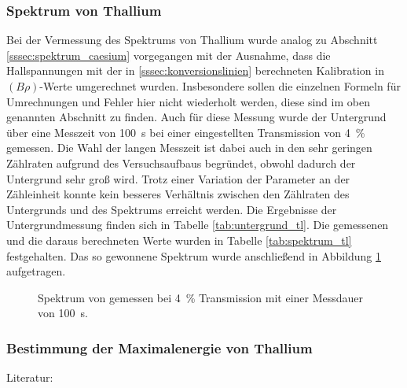 \documentclass[11pt, a4paper]{article}
\numberwithin{equation}{section}
\begin{document}
\subsubsection{Spektrum von Thallium}
\begin{table}
	\centering
	
	\caption{Untergrundmessung von  mit einer Messdauer von \SI{100}{\second} bei \SI{4}{\percent} Transmission.}
	\label{tab:untergrund_tl}
\end{table}
Bei der Vermessung des Spektrums von Thallium wurde analog zu Abschnitt \ref{sssec:spektrum_caesium} vorgegangen mit der Ausnahme, dass die Hallspannungen mit der in \ref{sssec:konversionslinien} berechneten Kalibration in $(B \rho)$-Werte umgerechnet wurden.
Insbesondere sollen die einzelnen Formeln für Umrechnungen und Fehler hier nicht wiederholt werden, diese sind im oben genannten Abschnitt zu finden.
Auch für diese Messung wurde der Untergrund über eine Messzeit von \SI{100}{\second} bei einer eingestellten Transmission von \SI{4}{\percent} gemessen.
Die Wahl der langen Messzeit ist dabei auch in den sehr geringen Zählraten aufgrund des Versuchsaufbaus begründet, obwohl dadurch der Untergrund sehr groß wird.
Trotz einer Variation der Parameter an der Zähleinheit konnte kein besseres Verhältnis zwischen den Zählraten des Untergrunds und des Spektrums erreicht werden.
Die Ergebnisse der Untergrundmessung finden sich in Tabelle \ref{tab:untergrund_tl}.
Die gemessenen und die daraus berechneten Werte wurden in Tabelle \ref{tab:spektrum_tl} festgehalten.
Das so gewonnene Spektrum wurde anschließend in Abbildung \ref{fig:thallium_spectrum} aufgetragen.
\begin{figure}[h]
	\centering
	
	\caption{Spektrum von  gemessen bei \SI{4}{\percent} Transmission mit einer Messdauer von \SI{100}{\second}.}
	\label{fig:thallium_spectrum}
\end{figure}

\subsubsection{Bestimmung der Maximalenergie von Thallium}
\label{sssec:kurie_thallium}

Literatur:\\
\end{document}
